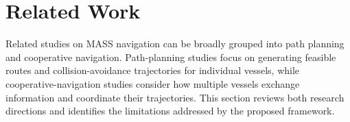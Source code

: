 \documentclass[final,5p,times,twocolumn]{elsarticle}
\begin{document}

\section{Related Work}
{\color{violet}
Related studies on MASS navigation can be broadly grouped into path planning and cooperative navigation. Path-planning studies focus on generating feasible routes and collision-avoidance trajectories for individual vessels, while cooperative-navigation studies consider how multiple vessels exchange information and coordinate their trajectories. This section reviews both research directions and identifies the limitations addressed by the proposed framework.
}
\end{document}
